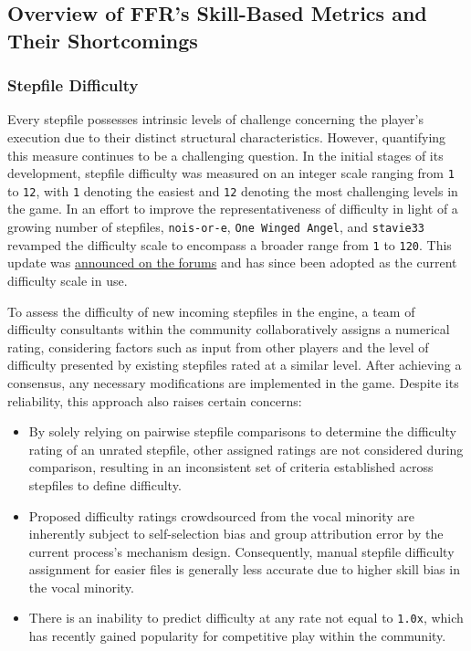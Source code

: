 \subsection{Overview of FFR's Skill-Based Metrics and Their Shortcomings}
\subsubsection{Stepfile Difficulty}
Every stepfile possesses intrinsic levels of challenge concerning the player's execution due to their distinct structural characteristics. However, quantifying this measure continues to be a challenging question. In the initial stages of its development, stepfile difficulty was measured on an integer scale ranging from \texttt{1} to \texttt{12}, with \texttt{1} denoting the easiest and \texttt{12} denoting the most challenging levels in the game. In an effort to improve the representativeness of difficulty in light of a growing number of stepfiles, \texttt{nois-or-e}, \texttt{One Winged Angel}, and \texttt{stavie33} revamped the difficulty scale to encompass a broader range from \texttt{1} to \texttt{120}. This update was \href{https://www.flashflashrevolution.com/vbz/showthread.php?t=124260}{announced on the forums} and has since been adopted as the current difficulty scale in use.

\vspace{2mm}

To assess the difficulty of new incoming stepfiles in the engine, a team of difficulty consultants within the community collaboratively assigns a numerical rating, considering factors such as input from other players and the level of difficulty presented by existing stepfiles rated at a similar level. After achieving a consensus, any necessary modifications are implemented in the game. Despite its reliability, this approach also raises certain concerns:

\begin{itemize}
	\item By solely relying on pairwise stepfile comparisons to determine the difficulty rating of an unrated stepfile, other assigned ratings are not considered during comparison, resulting in an inconsistent set of criteria established across stepfiles to define difficulty.
	\item Proposed difficulty ratings crowdsourced from the vocal minority are inherently subject to self-selection bias and group attribution error by the current process's mechanism design. Consequently, manual stepfile difficulty assignment for easier files is generally less accurate due to higher skill bias in the vocal minority.
	\item There is an inability to 
	      predict difficulty at any rate not equal to \texttt{1.0x}, which has recently gained popularity for competitive play within the community.
\end{itemize}

